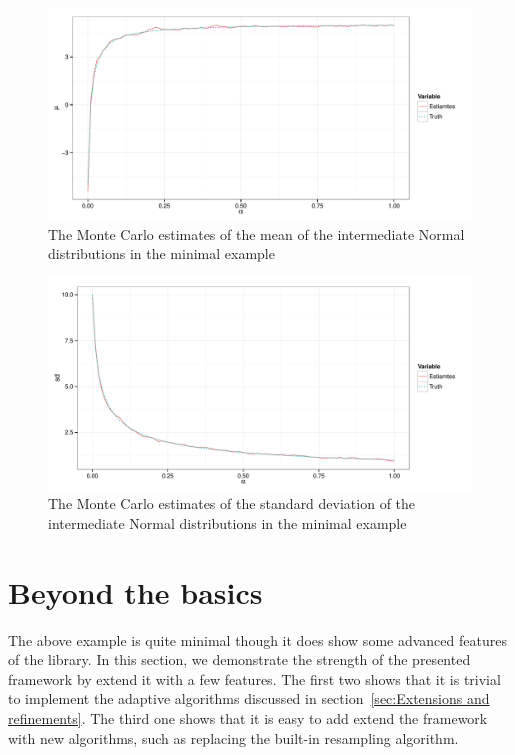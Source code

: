\begin{figure}
  \includegraphics[width=\linewidth]{fig/mini_mu}
  \caption{The Monte Carlo estimates of the mean of the intermediate Normal
    distributions in the minimal example}
  \label{fig:mini mean}
\end{figure}

\begin{figure}
  \includegraphics[width=\linewidth]{fig/mini_sd}
  \caption{The Monte Carlo estimates of the standard deviation of the
    intermediate Normal distributions in the minimal example}
  \label{fig:mini var}
\end{figure}

\section{Beyond the basics}
\label{sec:Beyond the basics}

The above example is quite minimal though it does show some advanced features
of the \vsmc library. In this section, we demonstrate the strength of the
presented framework by extend it with a few features. The first two shows that
it is trivial to implement the adaptive algorithms discussed in
section~\ref{sec:Extensions and refinements}. The third one shows that it is
easy to add extend the framework with new algorithms, such as replacing the
built-in resampling algorithm.

